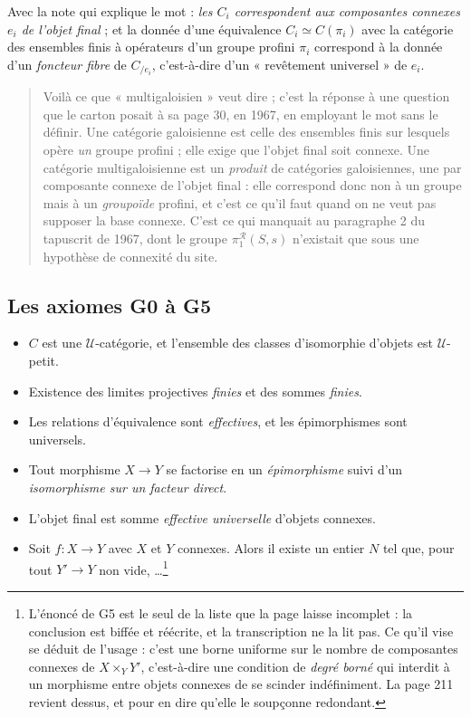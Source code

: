 \documentclass[11pt,a4paper]{article}
\begin{document}
Avec la note qui explique le mot : \emph{les $C_{i}$ correspondent aux
composantes connexes $e_{i}$ de l'objet final} ; et la donnée d'une équivalence
$C_{i} \simeq C(\pi_{i})$ avec la catégorie des ensembles finis à opérateurs
d'un groupe profini $\pi_{i}$ correspond à la donnée d'un \emph{foncteur fibre}
de $C_{/e_{i}}$, c'est-à-dire d'un « revêtement universel » de $e_{i}$.

\begin{quote}
Voilà ce que « multigaloisien » veut dire ; c'est la réponse à une question
que le carton posait à sa page 30, en 1967, en employant le mot sans le
définir. Une catégorie galoisienne est celle des ensembles finis sur lesquels
opère \emph{un} groupe profini ; elle exige que l'objet final soit connexe. Une
catégorie multigaloisienne est un \emph{produit} de catégories galoisiennes,
une par composante connexe de l'objet final : elle correspond donc non à un
groupe mais à un \emph{groupoïde} profini, et c'est ce qu'il faut quand on ne
veut pas supposer la base connexe. C'est ce qui manquait au
paragraphe 2 du tapuscrit de 1967, dont le groupe
$\pi_{1}^{\mathcal{R}}(S,s)$ n'existait que sous une hypothèse de connexité du
site.
\end{quote}

\subsection*{Les axiomes G0 à G5}

\begin{itemize}
\item[\textbf{G0}] $C$ est une $\mathcal{U}$-catégorie, et l'ensemble des
  classes d'isomorphie d'objets est $\mathcal{U}$-petit.
\item[\textbf{G1}] Existence des limites projectives \emph{finies} et des
  sommes \emph{finies}.
\item[\textbf{G2}] Les relations d'équivalence sont \emph{effectives}, et les
  épimorphismes sont universels.
\item[\textbf{G3}] Tout morphisme $X \to Y$ se factorise en un
  \emph{épimorphisme} suivi d'un \emph{isomorphisme sur un facteur direct}.
\item[\textbf{G4}] L'objet final est somme \emph{effective universelle}
  d'objets connexes.
\item[\textbf{G5}] Soit $f : X \to Y$ avec $X$ et $Y$ connexes. Alors il existe
  un entier $N$ tel que, pour tout $Y' \to Y$ non vide, …\footnote{L'énoncé
  de G5 est le seul de la liste que la page laisse incomplet : la conclusion
  est biffée et réécrite, et la transcription ne la lit pas. Ce qu'il vise se
  déduit de l'usage : c'est une borne uniforme sur le nombre de composantes
  connexes de $X \times_{Y} Y'$, c'est-à-dire une condition de \emph{degré
  borné} qui interdit à un morphisme entre objets connexes de se scinder
  indéfiniment. La page 211 revient dessus, et pour en dire qu'elle le soupçonne
  redondant.}
\end{itemize}
\end{document}
